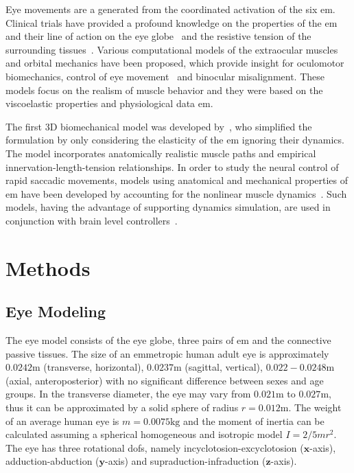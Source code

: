 \documentclass[11pt,a4paper,draft=false]{report}
\renewcommand*{\vec}[1]{\bm{#1}}
\begin{document}
Eye movements are a generated from the coordinated activation of the six
\gls{em}. Clinical trials have provided a profound knowledge on the properties
of the \gls{em} and their line of action on the eye globe~\cite{Robinson1969a}
and the resistive tension of the surrounding tissues~\cite{Collins1981,
  Iskander2018}. Various computational models of the extraocular muscles and
orbital mechanics have been proposed, which provide insight for oculomotor
biomechanics, control of eye movement~\cite{Bach-y-Rita1971} and binocular
misalignment. These models focus on the realism of muscle behavior and they were
based on the viscoelastic properties and physiological data \gls{em}.

The first 3D biomechanical model was developed by~\cite{Robinson1964a,
  Robinson1969}, who simplified the formulation by only considering the
elasticity of the \gls{em} ignoring their dynamics. The model incorporates
anatomically realistic muscle paths and empirical innervation-length-tension
relationships. In order to study the neural control of rapid saccadic movements,
models using anatomical and mechanical properties of \gls{em} have been
developed by accounting for the nonlinear muscle dynamics~\cite{Thelen2003a,
  Millard2013}. Such models, having the advantage of supporting dynamics
simulation, are used in conjunction with brain level
controllers~\cite{Angelaki2004, James2018}.

\section*{Methods}\label{sec:methods}

\subsection*{Eye Modeling}\label{sec:eye-Modeling}

The eye model consists of the eye globe, three pairs of \gls{em} and the
connective passive tissues. The size of an emmetropic human adult eye is
approximately $0.0242 \si{\m}$ (transverse, horizontal), $0.0237 \si{\m}$
(sagittal, vertical), $0.022 - 0.0248 \si{\m}$ (axial, anteroposterior) with no
significant difference between sexes and age groups. In the transverse diameter,
the eye may vary from $0.021 \si{\m}$ to $0.027 \si{\m}$, thus it can be
approximated by a solid sphere of radius $r = 0.012 \si{\m}$. The weight of an
average human eye is $m = 0.0075 \si{\kg}$ and the moment of inertia can be
calculated assuming a spherical homogeneous and isotropic model
$I = 2 / 5 m r^2$. The eye has three rotational \gls{dofs}, namely
incyclotosion-excyclotosion ($\vec{x}$-axis), adduction-abduction
($\vec{y}$-axis) and supraduction-infraduction ($\vec{z}$-axis).
\end{document}
